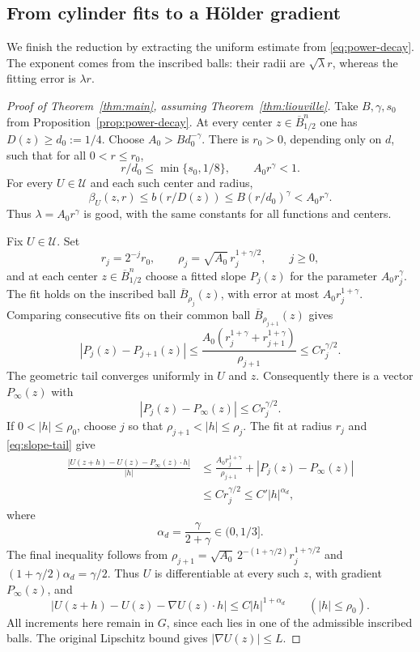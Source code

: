 \subsection{From cylinder fits to a H\"older gradient}

We finish the reduction by extracting the uniform estimate from \eqref{eq:power-decay}. The exponent comes from the inscribed balls: their radii are $\sqrt\lambda r$, whereas the fitting error is $\lambda r$.

\begin{proof}[Proof of Theorem~\ref{thm:main}, assuming Theorem~\ref{thm:liouville}]
Take $B,\gamma,s_0$ from Proposition~\ref{prop:power-decay}. At every center $z\in\overline B_{1/2}^n$ one has $D(z)\ge d_0:=1/4$. Choose $A_0>Bd_0^{-\gamma}$. There is $r_0>0$, depending only on $d$, such that for all $0<r\le r_0$,
\[
  r/d_0\le\min\{s_0,1/8\},\qquad A_0r^\gamma<1.
\]
For every $U\in\mathcal U$ and each such center and radius,
\[
  \beta_U(z,r)\le b(r/D(z))
       \le B(r/d_0)^\gamma<A_0r^\gamma.
\]
Thus $\lambda=A_0r^\gamma$ is good, with the same constants for all functions and centers.

Fix $U\in\mathcal U$. Set
\[
  r_j=2^{-j}r_0,\qquad
  \rho_j=\sqrt{A_0}\,r_j^{1+\gamma/2},\qquad j\ge0,
\]
and at each center $z\in\overline B_{1/2}^n$ choose a fitted slope $P_j(z)$ for the parameter $A_0r_j^\gamma$. The fit holds on the inscribed ball $\overline B_{\rho_j}(z)$, with error at most $A_0r_j^{1+\gamma}$. Comparing consecutive fits on their common ball $\overline B_{\rho_{j+1}}(z)$ gives
\[
  |P_j(z)-P_{j+1}(z)|
   \le\frac{A_0(r_j^{1+\gamma}+r_{j+1}^{1+\gamma})}{\rho_{j+1}}
   \le C r_j^{\gamma/2}.
\]
The geometric tail converges uniformly in $U$ and $z$. Consequently there is a vector $P_\infty(z)$ with
\begin{equation}\label{eq:slope-tail}
  |P_j(z)-P_\infty(z)|\le C r_j^{\gamma/2}.
\end{equation}
If $0<|h|\le\rho_0$, choose $j$ so that $\rho_{j+1}<|h|\le\rho_j$. The fit at radius $r_j$ and \eqref{eq:slope-tail} give
\begin{align*}
  \frac{|U(z+h)-U(z)-P_\infty(z)\cdot h|}{|h|}
   &\le\frac{A_0r_j^{1+\gamma}}{\rho_{j+1}}
            +|P_j(z)-P_\infty(z)|\\
   &\le C r_j^{\gamma/2}\le C'|h|^{\alpha_d},
\end{align*}
where
\begin{equation}\label{eq:holder-exponent}
  \alpha_d=\frac{\gamma}{2+\gamma}\in(0,1/3].
\end{equation}
The final inequality follows from
$\rho_{j+1}=\sqrt{A_0}\,2^{-(1+\gamma/2)}r_j^{1+\gamma/2}$ and
$(1+\gamma/2)\alpha_d=\gamma/2$. Thus $U$ is differentiable at every such $z$, with gradient $P_\infty(z)$, and
\begin{equation}\label{eq:uniform-taylor-estimate}
  |U(z+h)-U(z)-\nabla U(z)\cdot h|
       \le C|h|^{1+\alpha_d}\qquad(|h|\le\rho_0).
\end{equation}
All increments here remain in $G$, since each lies in one of the admissible inscribed balls. The original Lipschitz bound gives $|\nabla U(z)|\le L$.


\end{proof}

